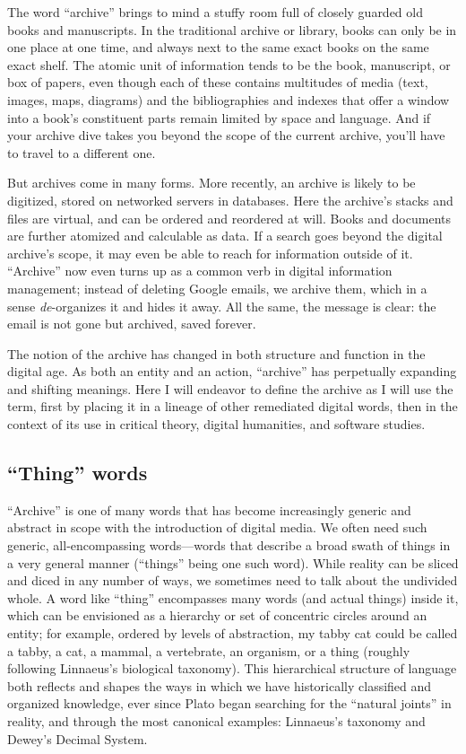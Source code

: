 The word ``archive'' brings to mind a stuffy room full of closely guarded old books and manuscripts. In the traditional archive or library, books can only be in one place at one time, and always next to the same exact books on the same exact shelf. The atomic unit of information tends to be the book, manuscript, or box of papers, even though each of these contains multitudes of media (text, images, maps, diagrams) and the bibliographies and indexes that offer a window into a book’s constituent parts remain limited by space and language. And if your archive dive takes you beyond the scope of the current archive, you’ll have to travel to a different one.

But archives come in many forms. More recently, an archive is likely to be digitized, stored on networked servers in databases. Here the archive's stacks and files are virtual, and can be ordered and reordered at will. Books and documents are further atomized and calculable as data. If a search goes beyond the digital archive's scope, it may even be able to reach for information outside of it. ``Archive'' now even turns up as a common verb in digital information management; instead of deleting Google emails, we archive them, which in a sense \emph{de}-organizes it and hides it away. All the same, the message is clear: the email is not gone but archived, saved forever. 

The notion of the archive has changed in both structure and function in the digital age. As both an entity and an action, ``archive'' has perpetually expanding and shifting meanings. Here I will endeavor to define the archive as I will use the term, first by placing it in a lineage of other remediated digital words, then in the context of its use in critical theory, digital humanities, and software studies.

\subsection{``Thing'' words}

``Archive'' is one of many words that has become increasingly generic and abstract in scope with the introduction of digital media. We often need such generic, all-encompassing words---words that describe a broad swath of things in a very general manner (``things'' being one such word). While reality can be sliced and diced in any number of ways, we sometimes need to talk about the undivided whole. A word like ``thing'' encompasses many words (and actual things) inside it, which can be envisioned as a hierarchy or set of concentric circles around an entity; for example, ordered by levels of abstraction, my tabby cat could be called a tabby, a cat, a mammal, a vertebrate, an organism, or a thing (roughly following Linnaeus's biological taxonomy). This hierarchical structure of language both reflects and shapes the ways in which we have historically classified and organized knowledge, ever since Plato began searching for the ``natural joints'' in reality, and through the most canonical examples: Linnaeus's taxonomy and Dewey's Decimal System.

